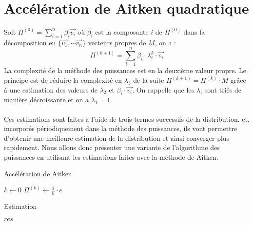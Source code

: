 \section{Accélération de Aitken quadratique}

	\paragraph{}Soit $\Pi^{(0)} = \sum_{i = 1}^{n} \beta_{i}\vec{v_{i}}$ où $\beta_{i}$ est la composante $i$ de $\Pi^{(0)}$ dans la décomposition en $\{ \vec{v_{1}}, \cdots \vec{v_{n}} \} $ vecteurs propres de $M$, on a : \[\Pi^{(k + 1)} = \sum_{i = 1}^{n} \beta_{i} \cdot \lambda_{i}^{k} \cdot \vec{v_{i}}\]
	La complexité de la méthode des puissances est en la deuxième valeur propre. Le principe est de réduire la complexité en $\lambda_{3}$ de la suite $\Pi^{(k + 1)} = \Pi^{(k)} \cdot M$ grâce à une estimation des valeurs de $\lambda_{2}$ et $ \beta_{i} \cdot \vec{v_{i}}$. On rappelle que les $\lambda_{i}$ sont triés de manière décroissante et on a $\lambda_{1} = 1$.
	
	\paragraph{}Ces estimations sont faites à l'aide de trois termes successifs de la distribution, et, incorporés périodiquement dans la méthode des puissances, ils vont permettre d'obtenir une meilleure estimation de la distribution et ainsi converger plus rapidement. Nous allons donc présenter une variante de l'algorithme des puissances en utilisant les estimations faites avec la méthode de Aitken.\\
	
	\begin{adjustwidth}{1.5cm}{1.5cm} 
		\begin{algorithm}[H]
			\caption{Accélération de Aitken}
			$k \gets 0$ 
			$\Pi^{(k)} \gets \frac{1}{n} \cdot e$\; 
		\end{algorithm}
		\end{adjustwidth}
		
		\begin{adjustwidth}{1.5cm}{1.5cm} 
		\begin{algorithm}[H]
			\caption{Estimation}
				\Retour $res$\;
		\end{algorithm}
		\end{adjustwidth}
	

